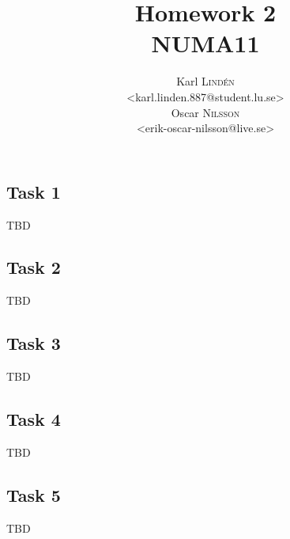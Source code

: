 \documentclass[a4paper,12pt]{article}
\begin{document}
\title{Homework 2 \\ NUMA11}
\author{
  Karl \textsc{Lind\'{e}n} \\
  <karl.linden.887@student.lu.se> \\
  Oscar \textsc{Nilsson} \\
  <erik-oscar-nilsson@live.se>
}

\maketitle
\thispagestyle{empty}

\newpage

\subsection*{Task 1}

TBD

\subsection*{Task 2}

TBD

\subsection*{Task 3}

TBD

\subsection*{Task 4}

TBD

\subsection*{Task 5}

TBD
\end{document}
